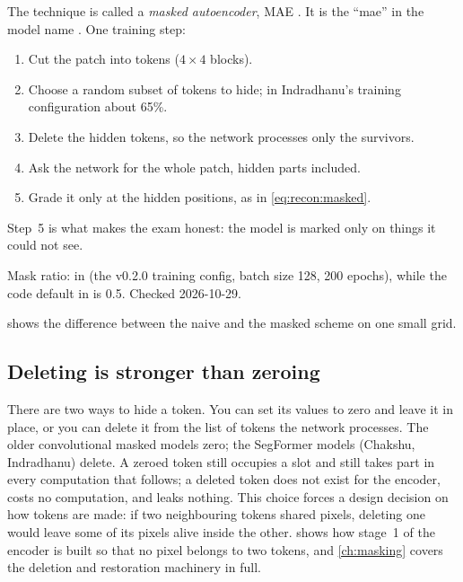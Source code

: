 The technique is called a \emph{masked autoencoder}, MAE
\citep{he2022masked}. It is the ``mae'' in the model name . One
training step:
\begin{enumerate}
\item Cut the patch into tokens ($4\times4$ blocks).
\item Choose a random subset of tokens to hide; in Indradhanu's training configuration about 65\%.
\item Delete the hidden tokens, so the network processes only the survivors.
\item Ask the network for the whole patch, hidden parts included.
\item Grade it only at the hidden positions, as in \cref{eq:recon:masked}.
\end{enumerate}
Step~5 is what makes the exam honest: the model is marked only on things it could not see.

\begin{drift}
Mask ratio:  in  (the v0.2.0
training config, batch size 128, 200 epochs), while the code default in
 is 0.5. Checked 2026-10-29.
\end{drift}

 shows the difference between the naive and the masked scheme on one small grid.


\subsection{Deleting is stronger than zeroing}

There are two ways to hide a token. You can set its values to zero and leave it in place, or you can
delete it from the list of tokens the network processes. The older convolutional masked models zero;
the SegFormer models (Chakshu, Indradhanu) delete. A zeroed token still occupies a slot and still
takes part in every computation that follows; a deleted token does not exist for the encoder, costs no
computation, and leaks nothing. This choice forces a design decision on how tokens are made: if two
neighbouring tokens shared pixels, deleting one would leave some of its pixels alive inside the other.
 shows how stage~1 of the encoder is built so that no pixel belongs to two tokens,
and \cref{ch:masking} covers the deletion and restoration machinery in full.

